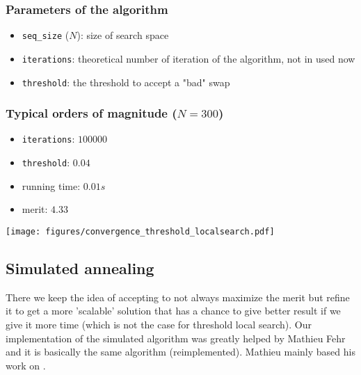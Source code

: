 \documentclass{article}
\begin{document}
 \begin{multicols}{2}
    \subsubsection*{Parameters of the algorithm}

      \begin{itemize}
        \item \texttt{seq\_size} ($N$): size of search space
        \item \texttt{iterations}: theoretical number of iteration of the
          algorithm, not in used now
        \item \texttt{threshold}: the threshold to accept a "bad" swap
      \end{itemize}

    \subsubsection*{Typical orders of magnitude ($N = 300$)}

      \begin{itemize}
        \item \texttt{iterations}: $100000$
        \item \texttt{threshold}: $0.04$
        \item running time: $0.01s$
        \item merit: $4.33$
      \end{itemize}

    \vphantom{0}

  \columnbreak

    \texttt{[image: figures/convergence\_threshold\_localsearch.pdf]}

  \end{multicols}

\subsection{Simulated annealing}

  There we keep the idea of accepting to not always maximize the merit but
  refine it to get a more 'scalable' solution that has a chance to give better
  result if we give it more time (which is not the case for threshold local
  search). Our implementation of the simulated algorithm was greatly helped by
  Mathieu Fehr and it is basically the same algorithm (reimplemented). Mathieu
  mainly based his work on \cite{KirkpatrickOptimizationBS}.
\end{document}
